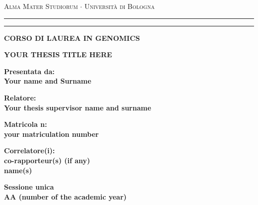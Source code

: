 \documentclass[12pt,a4paper]{article}
\begin{document}
\begin{titlepage}
\begin{center}
{{\Large{\textsc{Alma Mater Studiorum $\cdot$ Universit\`a di
Bologna}}}} \rule[0.1cm]{15.8cm}{0.1mm}
\rule[0.5cm]{15.8cm}{0.6mm}
{\small{\bf CORSO DI LAUREA IN GENOMICS }}
\end{center}
\vspace{15mm}
\begin{center}
{\LARGE{\bf YOUR THESIS TITLE HERE}}
\end{center}
\vspace{35mm}
\par
\noindent
\begin{minipage}[t]{0.47\textwidth}
{\large{\bf Presentata da:\\
Your name and Surname\\}}
\end{minipage}
\hfill
\begin{minipage}[t]{0.47\textwidth}\raggedleft
{\large{\bf Relatore:\\
Your thesis supervisor name and surname}}
\end{minipage}
\begin{minipage}[t]{0.47\textwidth}
{\large{\bf Matricola n\degree:\\
your matriculation number}}
\end{minipage}
\hfill
\begin{minipage}[t]{0.47\textwidth}\raggedleft
{\large{\bf Correlatore(i):\\
co-rapporteur(s) (if any)\\ name(s)}}
\end{minipage}

\vspace{70mm}
\begin{center}
{\large{\bf Sessione unica\\
AA (number of the academic year) }}
\end{center}
\end{titlepage}
\end{document}
